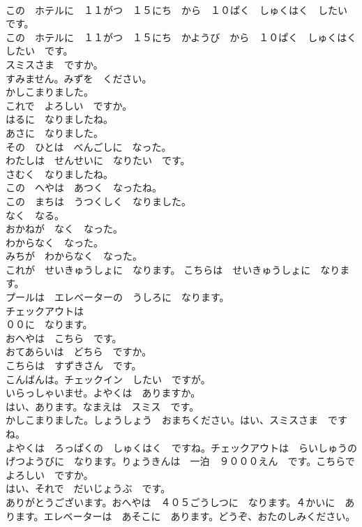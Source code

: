 \documentclass[8pt]{extreport}
\begin{document}
\begin{CJK}{UTF8}{min}
\\	この　ホテルに　１１がつ　１５にち　から　１０ぱく　しゅくはく　したい　です。	
\\	この　ホテルに　１１がつ　１５にち　かようび　から　１０ぱく　しゅくはく　したい　です。	
\\	スミスさま　ですか。	
\\	すみません。みずを　ください。	
\\	かしこまりました。	
\\	これで　よろしい　ですか。	
\\	はるに　なりましたね。	
\\	あさに　なりました。	
\\	その　ひとは　べんごしに　なった。	
\\	わたしは　せんせいに　なりたい　です。	
\\	さむく　なりましたね。	
\\	この　へやは　あつく　なったね。	
\\	この　まちは　うつくしく　なりました。	
\\	なく　なる。	
\\	おかねが　なく　なった。	
\\	わからなく　なった。	
\\	みちが　わからなく　なった。	
\\	これが　せいきゅうしょに　なります。 こちらは　せいきゅうしょに　なります。	
\\	プールは　エレベーターの　うしろに　なります。	
\\	チェックアウトは　
\\	００に　なります。	
\\	おへやは　こちら　です。	
\\	おてあらいは　どちら　ですか。	
\\	こちらは　すずきさん　です。	
\\	こんばんは。チェックイン　したい　ですが。	
\\	いらっしゃいませ。よやくは　ありますか。	
\\	はい、あります。なまえは　スミス　です。	
\\	かしこまりました。しょうしょう　おまちください。はい、スミスさま　ですね。	
\\	よやくは　ろっぱくの　しゅくはく　ですね。チェックアウトは　らいしゅうの　げつようびに　なります。りょうきんは　一泊　９０００えん　です。こちらで　よろしい　ですか。	
\\	はい、それで　だいじょうぶ　です。	
\\	ありがとうございます。おへやは　４０５ごうしつに　なります。４かいに　あります。エレベーターは　あそこに　あります。どうぞ、おたのしみください。	

\end{CJK}
\end{document}
